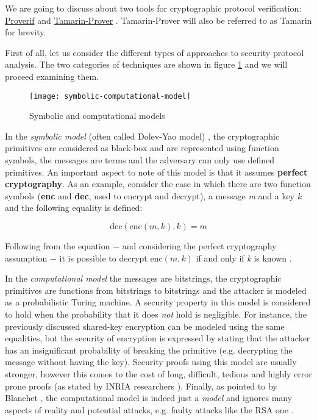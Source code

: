 
We are going to discuss about two tools for cryptographic protocol verification: \href{https://prosecco.gforge.inria.fr/personal/bblanche/proverif/}{Proverif} and \href{https://tamarin-prover.github.io/}{Tamarin-Prover} . Tamarin-Prover will also be referred to as Tamarin for brevity.

First of all, let us consider the different types of approaches to security protocol analysis. The two categories of techniques are shown in figure \ref{fig:symbolic-computational-model} and we will proceed examining them.

\begin{figure}[!h]
    \texttt{[image: symbolic-computational-model]}
    \centering
    \label{fig:symbolic-computational-model}
    \caption{Symbolic and computational models}
\end{figure}

In the \textit{symbolic model} (often called Dolev-Yao model) \cite{Dolev-Yao}, the cryptographic primitives are considered as black-box and are represented using function symbols, the messages are terms and the adversary can only use defined primitives. An important aspect to note of this model is that it assumes \textbf{perfect cryptography}. As an example, consider the case in which there are two function symbols (\textbf{enc} and \textbf{dec}, used to encrypt and decrypt), a message \textit{m} and a key \textit{k} and the following equality is defined:

\begin{equation}
\mbox{dec}\left(\mbox{enc}\left(m, k\right), k\right) = m
\end{equation}

Following from the equation $-$ and considering the perfect cryptography assumption $-$ it is possible to decrypt $\mbox{enc}\left(m, k\right)$ if and only if \textit{k} is known \cite{SymbolicComputationalBlanchet}.


In the \textit{computational model} the messages are bitstrings, the cryptographic primitives are functions from bitstrings to bitstrings and the attacker is modeled as a probabilistic Turing machine.
A security property in this model is considered to hold when the probability that it does \textit{not} hold is negligible. For instance, the previously discussed shared-key encryption can be modeled using the same equalities, but the security of encryption is expressed by stating that the attacker has an insignificant probability of breaking the primitive (e.g. decrypting the message without having the key). Security proofs using this model are usually stronger, however this comes to the cost of long, difficult, tedious and highly error prone proofs (as stated by INRIA researchers \cite{ComputationalAnalysisCryptoSystemsINRIA}). Finally, as pointed to by Blanchet \cite{SymbolicComputationalBlanchet}, the computational model is indeed just a \textit{model} and ignores many aspects of reality and potential attacks, e.g. faulty attacks like the RSA one \cite{RSAFaultAttack}. 

